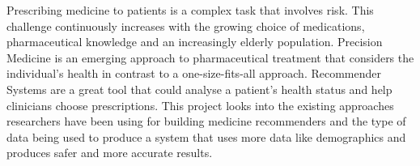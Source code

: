 
Prescribing medicine to patients is a complex task that involves risk.
This challenge continuously increases with the growing choice of
medications, pharmaceutical knowledge and an increasingly elderly
population. Precision Medicine is an emerging approach to pharmaceutical
treatment that considers the individual's health in contrast to a
one-size-fits-all approach. Recommender Systems are a great tool that
could analyse a patient's health status and help clinicians choose
prescriptions. This project looks into the existing approaches researchers
have been using for building medicine recommenders and the type of data
being used to produce a system that uses more data like demographics and
produces safer and more accurate results.

